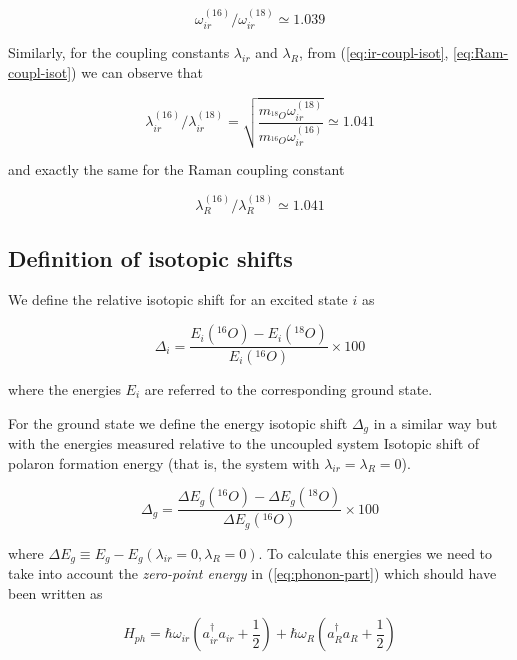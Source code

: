 \begin{equation}\label{eq:omega-ir-isot}
\omega^{(16)}_{ir} / \omega^{(18)}_{ir} \simeq 1.039
\end{equation}

Similarly, for the coupling constants $\lambda_{ir}$ and $\lambda_R$, from (\ref{eq:ir-coupl-isot}, \ref{eq:Ram-coupl-isot}) we can observe that

\begin{equation}\label{eq:lambda-ir-isot}
\lambda_{ir}^{(16)}/\lambda_{ir}^{(18)}=\sqrt{\frac{m_{^{18}O}\omega_{ir}^{(18)}}{m_{^{16}O}\omega_{ir}^{(16)}}}\simeq 1.041
\end{equation}

\noindent and exactly the same for the Raman coupling constant

\begin{equation}\label{eq:lambda-Ram-isot}
\lambda_R^{(16)} / \lambda_R^{(18)} \simeq 1.041
\end{equation}


\subsection{Definition of isotopic shifts}

We define the relative isotopic shift for an excited state $i$ as 

\begin{equation}\label{eq:isot-shift-def-exc}
\Delta_i = \frac{E_i(^{16}O)- E_i(^{18}O)}{E_i(^{16}O)} \times 100
\end{equation}

where the energies $E_i$ are referred to the corresponding ground state.

For the ground state we define the energy isotopic shift $\Delta_g$ in a similar way but with the energies measured relative to the uncoupled system Isotopic shift of polaron formation energy (that is, the system with $\lambda_{ir}=\lambda_R=0$).

\begin{equation}\label{eq:isot-shift-def-grd}
\Delta_g = \frac{\Delta E_g(^{16}O)- \Delta E_g(^{18}O)}{\Delta E_g(^{16}O)} \times 100
\end{equation}

where $\Delta E_g \equiv E_g - E_g(\lambda_{ir}=0, \lambda_R=0)$. To calculate this energies we need to take into account the \textit{zero-point energy} in (\ref{eq:phonon-part}) which should have been written as 

\begin{equation}\label{eq:phononic-part-complete}
H_{ph} = \hbar \omega_{ir} \left( a_{ir}^\dagger a_{ir} + \frac{1}{2}\right) + \hbar \omega_R\left( a_R^\dagger a_R + \frac{1}{2} \right)
\end{equation}


